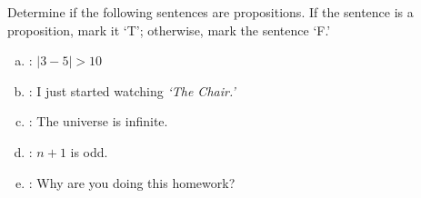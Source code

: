 \documentclass[11pt,letterpaper]{article}
\begin{document}

 Determine if the following sentences are propositions. If the sentence is a proposition, mark it `T'; otherwise, mark the sentence `F.'
	\begin{enumerate}[(a),topsep=0pt]
	\item {}: $|3 - 5| > 10$
	\item {}: I just started watching \textit{`The Chair.'}
	\item {}: The universe is infinite.
	\item {}: $n + 1$ is odd.  
	\item {}: Why are you doing this homework?
	\end{enumerate} \pspace
\end{document}
